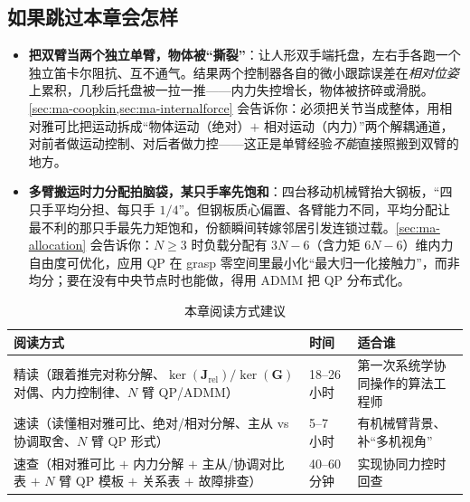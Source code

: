 \subsection*{如果跳过本章会怎样}
\begin{itemize}
  \item \textbf{把双臂当两个独立单臂，物体被“撕裂”}：让人形双手端托盘，左右手各跑一个独立笛卡尔阻抗、互不通气。结果两个控制器各自的微小跟踪误差在\emph{相对位姿}上累积，几秒后托盘被一拉一推——内力失控增长，物体被挤碎或滑脱。\cref{sec:ma-coopkin,sec:ma-internalforce} 会告诉你：必须把关节当成整体，用相对雅可比把运动拆成“物体运动（绝对）$+$ 相对运动（内力）”两个解耦通道，对前者做运动控制、对后者做力控——这正是单臂经验\emph{不能}直接照搬到双臂的地方。
  \item \textbf{多臂搬运时力分配拍脑袋，某只手率先饱和}：四台移动机械臂抬大钢板，“四只手平均分担、每只手 $1/4$”。但钢板质心偏置、各臂能力不同，平均分配让最不利的那只手最先力矩饱和，份额瞬间转嫁邻居引发连锁过载。\cref{sec:ma-allocation} 会告诉你：$N\ge3$ 时负载分配有 $3N-6$（含力矩 $6N-6$）维内力自由度可优化，应用 QP 在 grasp 零空间里最小化“最大归一化接触力”，而非均分；要在没有中央节点时也能做，得用 ADMM 把 QP 分布式化。
\end{itemize}

\begin{table}[H]\centering\small
\caption{本章阅读方式建议}
\label{tab:ma-reading}
\begin{tabular}{lll}
\toprule
阅读方式 & 时间 & 适合谁 \\
\midrule
精读（跟着推完对称分解、$\ker(\mathbf{J}_{\text{rel}})/\ker(\mathbf{G})$ 对偶、内力控制律、$N$ 臂 QP/ADMM） & 18--26 小时 & 第一次系统学协同操作的算法工程师 \\
速读（读懂相对雅可比、绝对/相对分解、主从 vs 协调取舍、$N$ 臂 QP 形式） & 5--7 小时 & 有机械臂背景、补“多机视角” \\
速查（相对雅可比 $+$ 内力分解 $+$ 主从/协调对比表 $+$ $N$ 臂 QP 模板 $+$ 关系表 $+$ 故障排查） & 40--60 分钟 & 实现协同力控时回查 \\
\bottomrule
\end{tabular}
\end{table}

